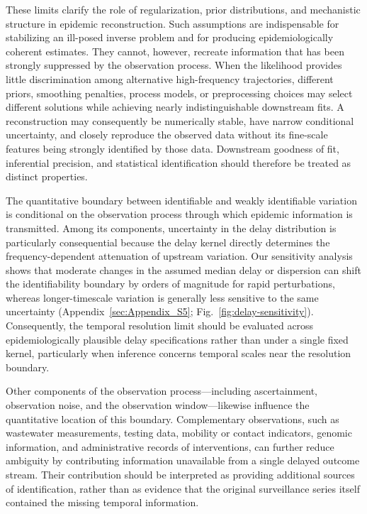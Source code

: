 These limits clarify the role of regularization, prior distributions, and mechanistic structure in epidemic reconstruction. Such assumptions are indispensable for stabilizing an ill-posed inverse problem and for producing epidemiologically coherent estimates. They cannot, however, recreate information that has been strongly suppressed by the observation process. When the likelihood provides little discrimination among alternative high-frequency trajectories, different priors, smoothing penalties, process models, or preprocessing choices may select different solutions while achieving nearly indistinguishable downstream fits. A reconstruction may consequently be numerically stable, have narrow conditional uncertainty, and closely reproduce the observed data without its fine-scale features being strongly identified by those data. Downstream goodness of fit, inferential precision, and statistical identification should therefore be treated as distinct properties. 

The quantitative boundary between identifiable and weakly identifiable variation is conditional on the observation process through which epidemic information is transmitted. Among its components, uncertainty in the delay distribution is particularly consequential because the delay kernel directly determines the frequency-dependent attenuation of upstream variation. Our sensitivity analysis shows that moderate changes in the
assumed median delay or dispersion can shift the identifiability boundary by orders of magnitude for rapid perturbations, whereas longer-timescale variation is generally less sensitive to the same uncertainty (Appendix~\ref{sec:Appendix_S5}; Fig.~\ref{fig:delay-sensitivity}). Consequently, the temporal resolution limit should be evaluated across epidemiologically plausible delay specifications rather than under a single fixed kernel,
particularly when inference concerns temporal scales near the resolution boundary.

Other components of the observation process—including ascertainment, observation noise, and the observation window—likewise influence the quantitative location of this boundary. Complementary observations, such as wastewater measurements, testing data, mobility or contact indicators, genomic information, and administrative records of interventions, can further reduce ambiguity by contributing information unavailable from a
single delayed outcome stream. Their contribution should be interpreted as providing additional sources of identification, rather than as evidence that the original surveillance series itself contained the missing temporal information.

